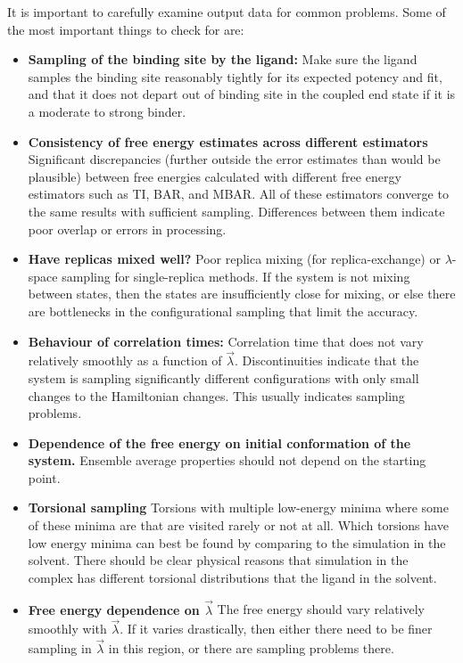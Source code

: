 \documentclass[9pt,bestpractices]{livecoms}
\begin{document}
It is important to carefully examine output data for common problems. Some of the most important things to check for are:
\begin{itemize}
\item \textbf{Sampling of the binding site by the ligand:} Make sure the ligand samples the binding site reasonably tightly for its expected potency and fit, and that it does not depart out of binding site in the coupled end state if it is a moderate to strong binder. 
\item \textbf{Consistency of free energy estimates across different estimators} Significant discrepancies (further outside the error estimates than would be plausible) between free energies calculated with different free energy estimators such as TI, BAR, and MBAR. All of these estimators converge to the same results with sufficient sampling. Differences between them indicate poor overlap or errors in processing.
\item \textbf{Have replicas mixed well?} Poor replica mixing (for replica-exchange) or $\lambda$-space sampling for single-replica methods. If the system is not mixing between states, then the states are insufficiently close for mixing, or else there are bottlenecks in the configurational sampling that limit the accuracy.
\item \textbf{Behaviour of correlation times:} Correlation time that does not vary relatively smoothly as a function of $\vec{\lambda}$. Discontinuities indicate that the system is sampling significantly different configurations with only small changes to the Hamiltonian changes. This usually indicates sampling problems.
\item \textbf{Dependence of the free energy on initial conformation of the system.} Ensemble average properties should not depend on the starting point.
\item \textbf{Torsional sampling} Torsions with multiple low-energy minima where some of these minima are that are visited rarely or not at all. Which torsions have low energy minima can best be found by comparing to the simulation in the solvent. There should be clear physical reasons that simulation in the complex has different torsional distributions that the ligand in the solvent. 
\item \textbf{Free energy dependence on $\vec{\lambda}$} The free energy should vary relatively smoothly with $\vec{\lambda}$. If it varies drastically, then either there need to be finer sampling in $\vec{\lambda}$ in this region, or there are sampling problems there.

\end{itemize}
\end{document}
